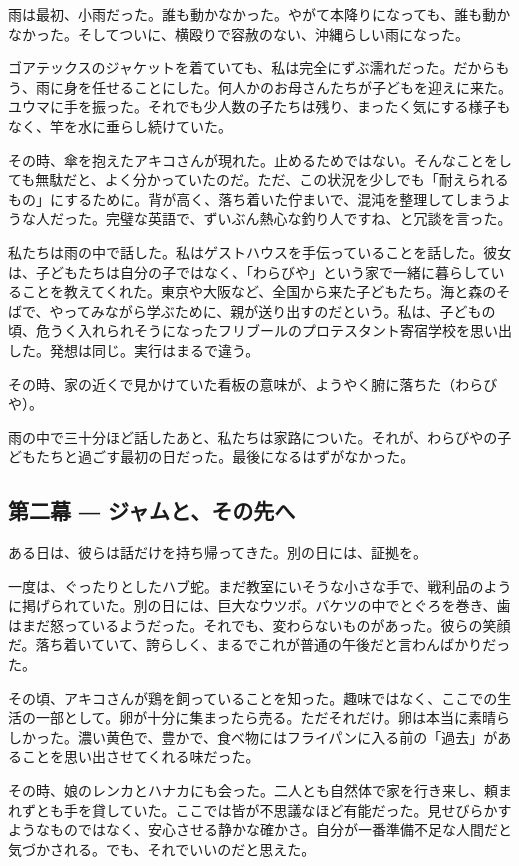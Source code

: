 \documentclass[
  letterpaper,
  oneside]{scrbook}
\begin{document}
雨は最初、小雨だった。誰も動かなかった。やがて本降りになっても、誰も動かなかった。そしてついに、横殴りで容赦のない、沖縄らしい雨になった。

ゴアテックスのジャケットを着ていても、私は完全にずぶ濡れだった。だからもう、雨に身を任せることにした。何人かのお母さんたちが子どもを迎えに来た。ユウマに手を振った。それでも少人数の子たちは残り、まったく気にする様子もなく、竿を水に垂らし続けていた。

その時、傘を抱えたアキコさんが現れた。止めるためではない。そんなことをしても無駄だと、よく分かっていたのだ。ただ、この状況を少しでも「耐えられるもの」にするために。背が高く、落ち着いた佇まいで、混沌を整理してしまうような人だった。完璧な英語で、ずいぶん熱心な釣り人ですね、と冗談を言った。

私たちは雨の中で話した。私はゲストハウスを手伝っていることを話した。彼女は、子どもたちは自分の子ではなく、「わらびや」という家で一緒に暮らしていることを教えてくれた。東京や大阪など、全国から来た子どもたち。海と森のそばで、やってみながら学ぶために、親が送り出すのだという。私は、子どもの頃、危うく入れられそうになったフリブールのプロテスタント寄宿学校を思い出した。発想は同じ。実行はまるで違う。

その時、家の近くで見かけていた看板の意味が、ようやく腑に落ちた（わらびや）。

雨の中で三十分ほど話したあと、私たちは家路についた。それが、わらびやの子どもたちと過ごす最初の日だった。最後になるはずがなかった。

\subsection{第二幕 ―
ジャムと、その先へ}\label{ux7b2cux4e8cux5e55-ux30b8ux30e3ux30e0ux3068ux305dux306eux5148ux3078}

ある日は、彼らは話だけを持ち帰ってきた。別の日には、証拠を。

一度は、ぐったりとしたハブ蛇。まだ教室にいそうな小さな手で、戦利品のように掲げられていた。別の日には、巨大なウツボ。バケツの中でとぐろを巻き、歯はまだ怒っているようだった。それでも、変わらないものがあった。彼らの笑顔だ。落ち着いていて、誇らしく、まるでこれが普通の午後だと言わんばかりだった。

その頃、アキコさんが鶏を飼っていることを知った。趣味ではなく、ここでの生活の一部として。卵が十分に集まったら売る。ただそれだけ。卵は本当に素晴らしかった。濃い黄色で、豊かで、食べ物にはフライパンに入る前の「過去」があることを思い出させてくれる味だった。

その時、娘のレンカとハナカにも会った。二人とも自然体で家を行き来し、頼まれずとも手を貸していた。ここでは皆が不思議なほど有能だった。見せびらかすようなものではなく、安心させる静かな確かさ。自分が一番準備不足な人間だと気づかされる。でも、それでいいのだと思えた。
\end{document}
